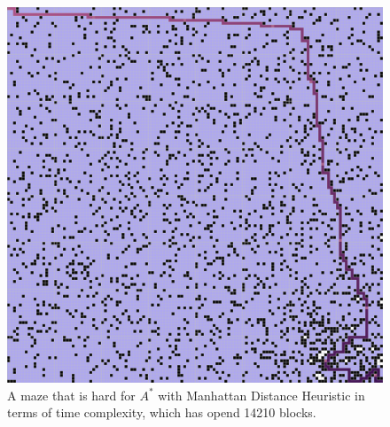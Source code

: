 \documentclass[letter]{article}
\begin{document}
\begin{enumerate}[resume]
\begin{enumerate}
\begin{enumerate}
\begin{figure}
					\includegraphics[width=\textwidth]{../pics/amb/14210.png}
					\caption{\label{fig:amb1}A maze that is hard for $ A^* $ with Manhattan Distance Heuristic in terms of time complexity, which has opend 14210 blocks.}
					

\end{figure}
\end{enumerate}
\end{enumerate}
\end{enumerate}
\end{document}
